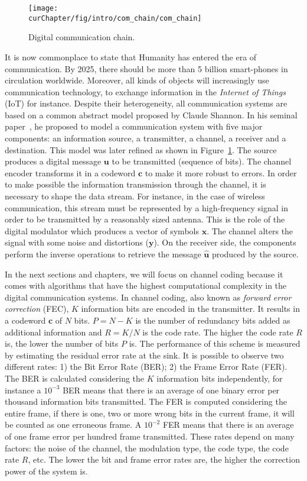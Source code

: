 \begin{figure}[htp]
  \centering
  \texttt{[image: \\curChapter/fig/intro/com\_chain/com\_chain]}
  \caption{Digital communication chain.}
  \label{fig:ctx_com_chain}
\end{figure}

It is now commonplace to state that Humanity has entered the era of
communication. By 2025, there should be more than 5 billion smart-phones in
circulation worldwide. Moreover, all kinds of objects will increasingly use
communication technology, to exchange information in the \emph{Internet of
Things} (IoT) for instance. Despite their heterogeneity, all communication
systems are based on a common abstract model proposed by Claude Shannon. In his
seminal paper~\cite{Shannon1948}, he proposed to model a communication system
with five major components: an information source, a transmitter, a channel, a
receiver and a destination. This model was later refined as shown in
Figure~\ref{fig:ctx_com_chain}. The source produces a digital message $\bm{u}$
to be transmitted (sequence of bits). The channel encoder transforms it in a
codeword $\bm{c}$ to make it more robust to errors. In order to make possible
the information transmission through the channel, it is necessary to shape the
data stream. For instance, in the case of wireless communication, this stream
must be represented by a high-frequency signal in order to be transmitted by a
reasonably sized antenna. This is the role of the digital modulator which
produces a vector of symbols $\bm{x}$. The channel alters the signal with some
noise and distortions ($\bm{y}$). On the receiver side, the components perform
the inverse operations to retrieve the message $\bm{\hat{u}}$ produced by the
source.

In the next sections and chapters, we will focus on channel coding because it
comes with algorithms that have the highest computational complexity in the
digital communication systems. In channel coding, also known as \emph{forward
error correction} (FEC), $K$ information bits  are encoded in the transmitter.
It results in a codeword $\bm{c}$ of $N$ bits. $P = N - K$ is the number of
redundancy bits added as additional information and $R = K/N$ is the code rate.
The higher the code rate $R$ is, the lower the number of bits $P$ is. The
performance of this scheme is measured by estimating the residual error rate at
the sink. It is possible to observe two different rates: 1) the Bit Error Rate
(BER); 2) the Frame Error Rate (FER). The BER is calculated considering the $K$
information bits independently, for instance a $10^{-3}$ BER means that there is
an average of one binary error per thousand information bits transmitted. The
FER is computed considering the entire frame, if there is one, two or more wrong
bits in the current frame, it will be counted as one erroneous frame. A
$10^{-2}$ FER means that there is an average of one frame error per hundred
frame transmitted. These rates depend on many factors: the noise of the channel,
the modulation type, the code type, the code rate $R$, etc. The lower the bit
and frame error rates are, the higher the correction power of the system is.

